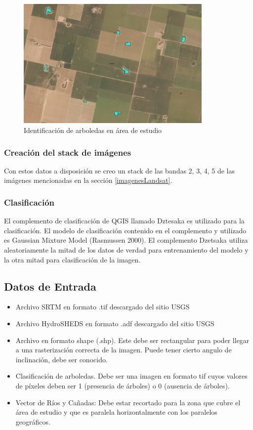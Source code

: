 \documentclass[10pt,a4paper, twoside]{report}
\begin{document}
\begin{figure}[!htb]
   \centering      
   \includegraphics[width=0.85\textwidth]{imagenes/ShapesArboles.jpg}
 \caption{Identificación de arboledas en área de estudio}
 \label{ShapeArboles}
\end{figure}

\subsubsection{Creación del stack de imágenes}

Con estos datos a disposición se creo un stack de las bandas 2, 3, 4, 5 de las imágenes mencionadas en la sección \ref{imagenesLandsat}.

\subsubsection{Clasificación}

El complemento de clasificación de QGIS llamado Dztesaka \cite{dzetsaka} es utilizado para la clasificación. El modelo de clasificación contenido en el complemento y utilizado es Gaussian Mixture Model (Rasmussen 2000). El complemento Dzetsaka utiliza aleatoriamente la mitad de los datos de verdad para entrenamiento del modelo y la otra mitad para clasificación de la imagen.


\subsection{Datos de Entrada}

\begin{itemize}
\item Archivo SRTM en formato .tif descargado del sitio USGS
\item Archivo HydroSHEDS en formato .adf descargado del sitio USGS
\item Archivo en formato shape (.shp). Este debe ser rectangular para poder llegar a una rasterización correcta de la imagen. Puede tener cierto angulo de inclinación, debe ser conocido.
\item Clasificación de arboledas. Debe ser una imagen en formato tif cuyos valores de píxeles deben ser 1 (presencia de árboles) o 0 (ausencia de árboles).
\item Vector de Ríos y Cañadas: Debe estar recortado para la zona que cubre el área de estudio y que es paralela horizontalmente con los paralelos geográficos.
\end{itemize}
\end{document}
